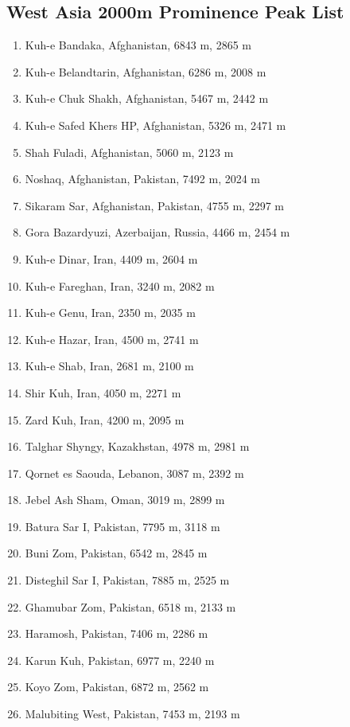 \documentclass[10pt,twocolumn,letterpaper]{article}
\begin{document}
\subsection{West Asia 2000m Prominence Peak List}
\begin{flushleft}
\begin{enumerate}
    \item Kuh-e Bandaka, Afghanistan, 6843 m, 2865 m
    \item Kuh-e Belandtarin, Afghanistan, 6286 m, 2008 m
    \item Kuh-e Chuk Shakh, Afghanistan, 5467 m, 2442 m
    \item Kuh-e Safed Khers HP, Afghanistan, 5326 m, 2471 m
    \item Shah Fuladi, Afghanistan, 5060 m, 2123 m
    \item Noshaq, Afghanistan, Pakistan, 7492 m, 2024 m
    \item Sikaram Sar, Afghanistan, Pakistan, 4755 m, 2297 m
    \item Gora Bazardyuzi, Azerbaijan, Russia, 4466 m, 2454 m
    \item Kuh-e Dinar, Iran, 4409 m, 2604 m
    \item Kuh-e Fareghan, Iran, 3240 m, 2082 m
    \item Kuh-e Genu, Iran, 2350 m, 2035 m
    \item Kuh-e Hazar, Iran, 4500 m, 2741 m
    \item Kuh-e Shab, Iran, 2681 m, 2100 m
    \item Shir Kuh, Iran, 4050 m, 2271 m
    \item Zard Kuh, Iran, 4200 m, 2095 m
    \item Talghar Shyngy, Kazakhstan, 4978 m, 2981 m
    \item Qornet es Saouda, Lebanon, 3087 m, 2392 m
    \item Jebel Ash Sham, Oman, 3019 m, 2899 m
    \item Batura Sar I, Pakistan, 7795 m, 3118 m
    \item Buni Zom, Pakistan, 6542 m, 2845 m
    \item Disteghil Sar I, Pakistan, 7885 m, 2525 m
    \item Ghamubar Zom, Pakistan, 6518 m, 2133 m
    \item Haramosh, Pakistan, 7406 m, 2286 m
    \item Karun Kuh, Pakistan, 6977 m, 2240 m
    \item Koyo Zom, Pakistan, 6872 m, 2562 m
    \item Malubiting West, Pakistan, 7453 m, 2193 m

\end{enumerate}
\end{flushleft}
\end{document}
